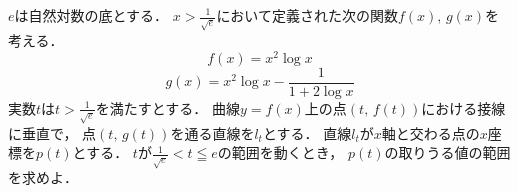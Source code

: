 \documentclass[../../main.tex]{subfiles}
\begin{document}
$e$は自然対数の底とする．
$\displaystyle x>\frac{1}{\sqrt{e}}$において定義された次の関数$f(x), \, g(x)$を考える．
\[ f(x)=x^2\log x \]
\[ g(x)=x^2\log x-\frac{1}{1+2\log x} \]
実数$t$は$\displaystyle t>\frac{1}{\sqrt{e}}$を満たすとする．
曲線$y=f(x)$上の点$(t, \, f(t))$における接線に垂直で，
点$(t, \, g(t))$を通る直線を$l_t$とする．
直線$l_t$が$x$軸と交わる点の$x$座標を$p(t)$とする．
$t$が$\displaystyle \frac{1}{\sqrt{e}} < t \leqq e$の範囲を動くとき，
$p(t)$の取りうる値の範囲を求めよ．
\end{document}
